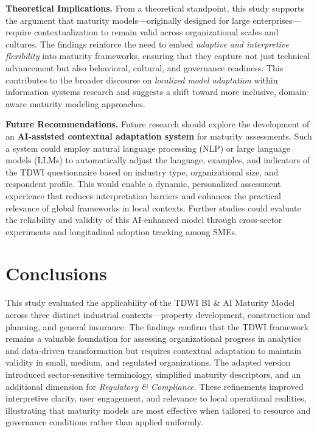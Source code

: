 \documentclass[conference]{IEEEtran}
\begin{document}
\textbf{Theoretical Implications.}  
From a theoretical standpoint, this study supports the argument that maturity models—originally designed for large enterprises—require contextualization to remain valid across organizational scales and cultures.  
The findings reinforce the need to embed \textit{adaptive and interpretive flexibility} into maturity frameworks, ensuring that they capture not just technical advancement but also behavioral, cultural, and governance readiness.  
This contributes to the broader discourse on \emph{localized model adaptation} within information systems research and suggests a shift toward more inclusive, domain-aware maturity modeling approaches.

\textbf{Future Recommendations.}  
Future research should explore the development of an \textbf{AI-assisted contextual adaptation system} for maturity assessments.  
Such a system could employ natural language processing (NLP) or large language models (LLMs) to automatically adjust the language, examples, and indicators of the TDWI questionnaire based on industry type, organizational size, and respondent profile.  
This would enable a dynamic, personalized assessment experience that reduces interpretation barriers and enhances the practical relevance of global frameworks in local contexts.  
Further studies could evaluate the reliability and validity of this AI-enhanced model through cross-sector experiments and longitudinal adoption tracking among SMEs.



\section{Conclusions}
\label{sec:conclusions}

This study evaluated the applicability of the TDWI BI \& AI Maturity Model across three distinct industrial contexts—property development, construction and planning, and general insurance. The findings confirm that the TDWI framework remains a valuable foundation for assessing organizational progress in analytics and data-driven transformation but requires contextual adaptation to maintain validity in small, medium, and regulated organizations. The adapted version introduced sector-sensitive terminology, simplified maturity descriptors, and an additional dimension for \textit{Regulatory \& Compliance}. These refinements improved interpretive clarity, user engagement, and relevance to local operational realities, illustrating that maturity models are most effective when tailored to resource and governance conditions rather than applied uniformly.
\end{document}
